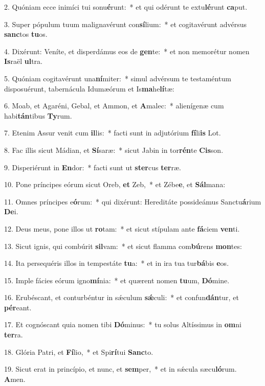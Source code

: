 2. Quóniam ecce inimíci tui sonu\textbf{é}runt:~*  et qui odérunt te extu\textbf{lé}runt \textbf{ca}put.\

3. Super pópulum tuum malignavérunt con\textbf{sí}lium:~*  et cogitavérunt advérsus \textbf{sanc}tos \textbf{tu}os.\

4. Dixérunt: Veníte, et disperdámus eos de \textbf{gen}te:~*  et non memorétur nomen \textbf{Is}raël \textbf{ul}tra.\

5. Quóniam cogitavérunt una\textbf{ní}miter:~*  simul advérsum te testaméntum disposuérunt, tabernácula Idumæórum et Is\textbf{ma}he\textbf{lí}tæ:\

6. Moab, et Agaréni, Gebal, et Ammon, et \textbf{A}malec:~*  alienígenæ cum habi\textbf{tán}tibus \textbf{Ty}rum.\

7. Etenim Assur venit cum \textbf{il}lis:~*  facti sunt in adjutórium \textbf{fí}li\textbf{is} Lot.\

8. Fac illis sicut Mádian, et \textbf{Sí}saræ:~*  sicut Jabin in tor\textbf{rén}te \textbf{Cis}son.\

9. Disperiérunt in \textbf{En}dor:~*  facti sunt ut \textbf{ster}cus \textbf{ter}ræ.\

10. Pone príncipes eórum sicut Oreb, \textbf{et} Zeb,~*  et Zébe\textbf{e}, et \textbf{Sál}mana:\

11. Omnes príncipes e\textbf{ó}rum:~*  qui dixérunt: Hereditáte possideámus Sanctu\textbf{á}rium \textbf{De}i.\

12. Deus meus, pone illos ut \textbf{ro}tam:~*  et sicut stípulam ante \textbf{fá}ciem \textbf{ven}ti.\

13. Sicut ignis, qui combúrit \textbf{sil}vam:~*  et sicut flamma com\textbf{bú}rens \textbf{mon}tes:\

14. Ita persequéris illos in tempestáte \textbf{tu}a:~*  et in ira tua tur\textbf{bá}bis \textbf{e}os.\

15. Imple fácies eórum igno\textbf{mí}nia:~*  et quærent nomen \textbf{tu}um, \textbf{Dó}mine.\

16. Erubéscant, et conturbéntur in sǽculum \textbf{sǽ}culi:~*  et confun\textbf{dán}tur, et \textbf{pér}eant.\

17. Et cognóscant quia nomen tibi \textbf{Dó}minus:~*  tu solus Altíssimus in \textbf{om}ni \textbf{ter}ra.\

18. Glória Patri, et \textbf{Fí}lio,~*  et Spi\textbf{rí}tui \textbf{Sanc}to.\

19. Sicut erat in princípio, et nunc, et \textbf{sem}per,~*  et in sǽcula sæcu\textbf{ló}rum. \textbf{A}men.\

